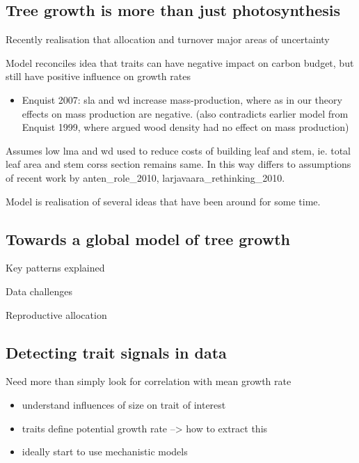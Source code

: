 \documentclass[12pt, a4paper]{article}
\begin{document}
\subsection*{Tree growth is more than just
photosynthesis}\label{tree-growth-is-more-than-just-photosynthesis}

Recently realisation that allocation and turnover major areas of
uncertainty

Model reconciles idea that traits can have negative impact on carbon
budget, but still have positive influence on growth rates

\begin{itemize}
\itemsep1pt\parskip0pt
\item
  Enquist 2007: sla and wd increase mass-production, where as in our
  theory effects on mass production are negative. (also contradicts
  earlier model from Enquist 1999, where argued wood density had no
  effect on mass production)
\end{itemize}

Assumes low lma and wd used to reduce costs of building leaf and stem,
ie. total leaf area and stem corss section remains same. In this way
differs to assumptions of recent work by anten\_role\_2010,
larjavaara\_rethinking\_2010.

Model is realisation of several ideas that have been around for some
time.

\subsection*{Towards a global model of tree
growth}\label{towards-a-global-model-of-tree-growth}

Key patterns explained

Data challenges

Reproductive allocation

\subsection*{Detecting trait signals in
data}\label{detecting-trait-signals-in-data}

Need more than simply look for correlation with mean growth rate

\begin{itemize}
\itemsep1pt\parskip0pt
\item
  understand influences of size on trait of interest
\item
  traits define potential growth rate --\textgreater{} how to extract
  this
\item
  ideally start to use mechanistic models
\end{itemize}
\end{document}
